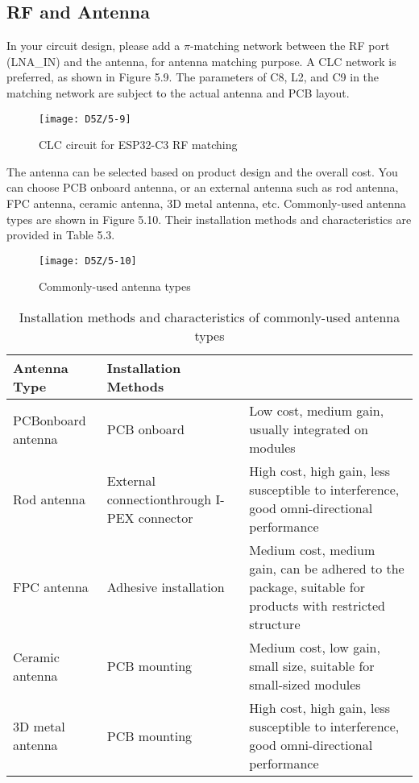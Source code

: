 \documentclass[a4paper,12pt]{book}
\begin{document}
\subsection{RF and Antenna}
In your circuit design, please add a $\pi$-matching network between the RF port (LNA\_IN) and the antenna, for antenna matching purpose. A CLC network is preferred, as shown in Figure 5.9. The parameters of C8, L2, and C9 in the matching network are subject to the actual antenna and PCB layout.

\begin{figure}[h!]
    \centering
    \texttt{[image: D5Z/5-9]}
    \caption{CLC circuit for ESP32-C3 RF matching}
\end{figure}

The antenna can be selected based on product design and the overall cost. You can choose PCB onboard antenna, or an external antenna such as rod antenna, FPC antenna, ceramic antenna, 3D metal antenna, etc. Commonly-used antenna types are shown in Figure 5.10. Their installation methods and characteristics are provided in Table 5.3.

\begin{figure}[h!]
    \centering
    \texttt{[image: D5Z/5-10]}
    \caption{Commonly-used antenna types}
\end{figure}

\begin{table}[h!]
    \renewcommand{\arraystretch}{1.2}
    \caption{Installation methods and characteristics of commonly-used antenna types}
    \begin{tabular}{|>{\Centering}m{8em}|>{\Centering}m{10em}|>{\RaggedRight}m{20.5em}|}
        \hline
        \rowcolor{LightBlue} \textbf{Antenna Type}&\textbf{Installation Methods}&\multicolumn{1}{c|}{\textbf{Characteristics}}\\
        \hline
        PCB\newline onboard antenna&PCB onboard&Low cost, medium gain, usually integrated on modules\\
        \hline
        Rod antenna&External connection\newline through I-PEX connector&High cost, high gain, less susceptible to interference, good omni-directional performance\\
        \hline
        FPC antenna&Adhesive installation&Medium cost, medium gain, can be adhered to the package, suitable for products with restricted structure\\
        \hline
        Ceramic antenna&PCB mounting&Medium cost, low gain, small size, suitable for small-sized modules\\
        \hline
        3D metal antenna&PCB mounting&High cost, high gain, less susceptible to interference, good omni-directional performance\\
        \hline
    \end{tabular}
\end{table}
\end{document}
